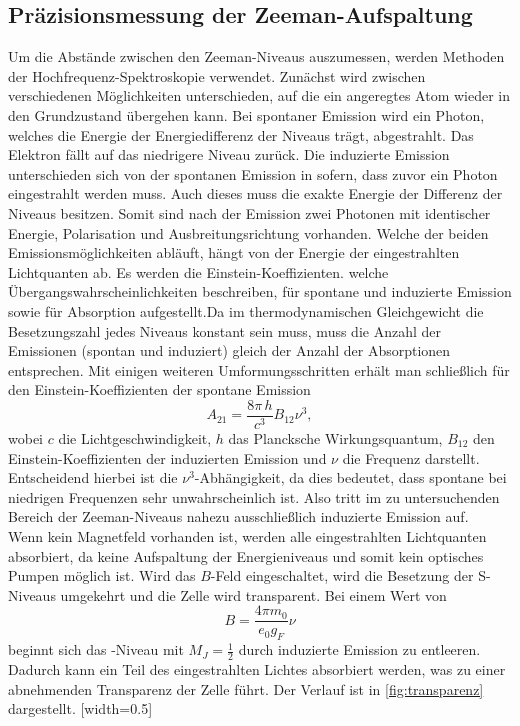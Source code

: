 \subsection{Präzisionsmessung der Zeeman-Aufspaltung}
Um die Abstände zwischen den Zeeman-Niveaus auszumessen, werden Methoden der Hochfrequenz-Spektroskopie verwendet. Zunächst wird zwischen verschiedenen Möglichkeiten unterschieden, auf die ein angeregtes Atom wieder in den Grundzustand übergehen kann. Bei spontaner Emission wird ein Photon, welches die Energie der Energiedifferenz der Niveaus trägt, abgestrahlt. Das Elektron fällt auf das niedrigere Niveau zurück. Die induzierte Emission unterschieden sich von der spontanen Emission in sofern, dass zuvor ein Photon eingestrahlt werden muss. Auch dieses muss die exakte Energie der Differenz der Niveaus besitzen. Somit sind nach der Emission zwei Photonen mit identischer Energie, Polarisation und Ausbreitungsrichtung vorhanden. Welche der beiden Emissionsmöglichkeiten abläuft, hängt von der Energie der eingestrahlten Lichtquanten ab. Es werden die Einstein-Koeffizienten. welche Übergangswahrscheinlichkeiten beschreiben, für spontane und induzierte Emission sowie für Absorption aufgestellt.Da im thermodynamischen Gleichgewicht die Besetzungszahl jedes Niveaus konstant sein muss, muss die Anzahl der Emissionen (spontan und induziert) gleich der Anzahl der Absorptionen entsprechen. Mit einigen weiteren Umformungsschritten erhält man schließlich für den Einstein-Koeffizienten der spontane Emission
\begin{equation}
  A_{21} = \frac{8\pi\,h}{c^3}B_{12}\nu^3,
\end{equation}
wobei $c$ die Lichtgeschwindigkeit, $h$ das Plancksche Wirkungsquantum, $B_{12}$ den Einstein-Koeffizienten der induzierten Emission und $\nu$ die Frequenz darstellt. Entscheidend hierbei ist die $\nu^3$-Abhängigkeit, da dies bedeutet, dass spontane bei niedrigen Frequenzen sehr unwahrscheinlich ist. Also tritt im zu untersuchenden Bereich der Zeeman-Niveaus nahezu ausschließlich induzierte Emission auf. \\
Wenn kein Magnetfeld vorhanden ist, werden alle eingestrahlten Lichtquanten absorbiert, da keine Aufspaltung der Energieniveaus und somit kein optisches Pumpen möglich ist. Wird das $B$-Feld eingeschaltet, wird die Besetzung der S-Niveaus umgekehrt und die Zelle wird transparent. Bei einem Wert von
\begin{equation}
  \label{eqn:gf}
  B = \frac{4\pi m_0}{e_0 g_F} \nu
\end{equation}
beginnt sich das -Niveau mit $M_J=\frac{1}{2}$ durch induzierte Emission zu entleeren. Dadurch kann ein Teil des eingestrahlten Lichtes absorbiert werden, was zu einer abnehmenden Transparenz der Zelle führt. Der Verlauf ist in \autoref{fig:transparenz} dargestellt.
[width=0.5\textwidth]

